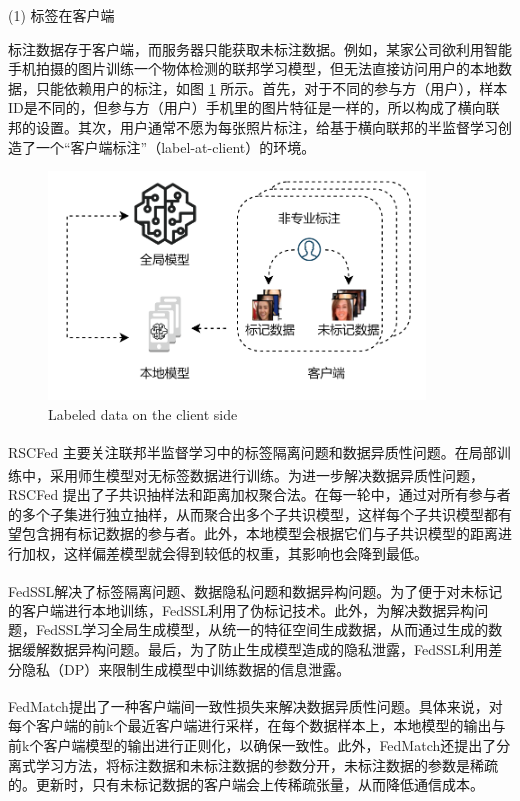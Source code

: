(1) 标签在客户端

标注数据存于客户端，而服务器只能获取未标注数据。例如，某家公司欲利用智能手机拍摄的图片训练一个物体检测的联邦学习模型，但无法直接访问用户的本地数据，只能依赖用户的标注，如图 \ref{LabelAtClient} 所示。首先，对于不同的参与方（用户），样本ID是不同的，但参与方（用户）手机里的图片特征是一样的，所以构成了横向联邦的设置。其次，用户通常不愿为每张照片标注，给基于横向联邦的半监督学习创造了一个“客户端标注”（label-at-client）的环境。
\vspace{-0.1cm}
\begin{figure}[h]
	\centering
	\includegraphics[width=10cm]{chapters/imgs/LabelAtClient}
	{\wuhao Labeled data on the client side}
	\label{LabelAtClient}
\end{figure}
\vspace{-0.35cm}
RSCFed\textsuperscript{\cite{liang2022rscfed}} 主要关注联邦半监督学习中的标签隔离问题和数据异质性问题。在局部训练中，采用师生模型\textsuperscript{\cite{tarvainen2017mean}}对无标签数据进行训练。为进一步解决数据异质性问题，RSCFed 提出了子共识抽样法和距离加权聚合法。在每一轮中，通过对所有参与者的多个子集进行独立抽样，从而聚合出多个子共识模型，这样每个子共识模型都有望包含拥有标记数据的参与者。此外，本地模型会根据它们与子共识模型的距离进行加权，这样偏差模型就会得到较低的权重，其影响也会降到最低。

FedSSL\textsuperscript{\cite{fan2022private}}解决了标签隔离问题、数据隐私问题和数据异构问题。为了便于对未标记的客户端进行本地训练，FedSSL利用了伪标记技术。此外，为解决数据异构问题，FedSSL学习全局生成模型，从统一的特征空间生成数据，从而通过生成的数据缓解数据异构问题。最后，为了防止生成模型造成的隐私泄露，FedSSL利用差分隐私（DP）来限制生成模型中训练数据的信息泄露。

FedMatch\textsuperscript{\cite{jeong2020federated}}提出了一种客户端间一致性损失来解决数据异质性问题。具体来说，对每个客户端的前k个最近客户端进行采样，在每个数据样本上，本地模型的输出与前k个客户端模型的输出进行正则化，以确保一致性。此外，FedMatch还提出了分离式学习方法，将标注数据和未标注数据的参数分开，未标注数据的参数是稀疏的。更新时，只有未标记数据的客户端会上传稀疏张量，从而降低通信成本。


